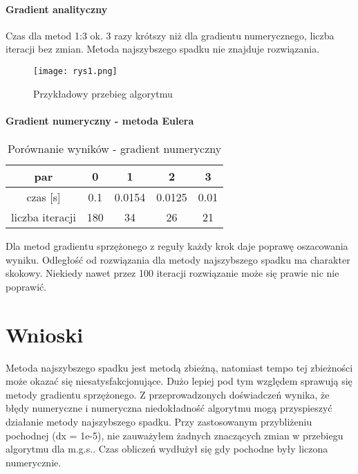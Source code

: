 \documentclass[11pt,a4paper]{article}
\begin{document}
 \paragraph*{Gradient analityczny}
 Czas dla metod 1:3 ok. 3 razy krótszy niż dla gradientu numerycznego,
 liczba iteracji bez zmian.
 Metoda najszybszego spadku nie znajduje rozwiązania. 

\begin{figure}[H]
	\centering
	\texttt{[image: rys1.png]}
	\caption{Przykładowy przebieg algorytmu}
\end{figure} 
 
 \paragraph*{Gradient numeryczny - metoda Eulera}
 

\begin{table}[H]
	\centering
	\caption{Porównanie wyników - gradient numeryczny}
	\begin{tabular}{|c|c|c|c|c|}
		\hline
		 par & 0  & 1 & 2 & 3\\
		\hline
		 czas [s] & 0.1 & 0.0154 & 0.0125 & 0.01\\
		 \hline
		 liczba iteracji & 180 & 34 & 26 & 21\\
		 \hline
		\end{tabular}
\end{table}
 Dla metod gradientu sprzężonego z reguły każdy krok daje poprawę 
 oszacowania wyniku. Odległość od rozwiązania dla metody najszybszego
 spadku ma charakter skokowy. Niekiedy nawet przez 100 iteracji
 rozwiązanie może się prawie nic nie poprawić.

\section{Wnioski}
Metoda najszybszego spadku jest metodą zbieżną, natomiast tempo tej zbieżności może okazać się niesatysfakcjonujące.
Dużo lepiej pod tym względem sprawują się metody gradientu sprzężonego. Z przeprowadzonych doświadczeń wynika, że błędy numeryczne i numeryczna niedokładność algorytmu mogą przyspieszyć działanie metody najszybszego spadku. Przy zastosowanym przybliżeniu pochodnej (dx = 1e-5), nie zauważyłem żadnych znaczących zmian w przebiegu algorytmu dla m.g.s.. Czas obliczeń wydłużył się gdy pochodne były liczona numerycznie.
\end{document}
